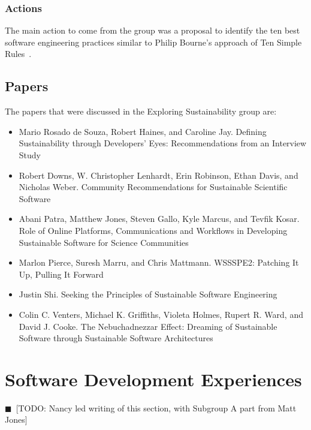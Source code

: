 \documentclass[11pt, oneside]{amsart}
\newcommand{\todo}[1]{{\color{blue}$\blacksquare$~\textsf{[TODO: #1]}}}
\begin{document}
\subsubsection{Actions}

The main action to come from the group was a proposal to identify the ten best
software engineering practices similar to Philip Bourne's approach of Ten Simple
Rules~\cite{bourne-ten-simple-rules}.

\subsection{Papers}
The papers that were discussed in the Exploring Sustainability group are:
\begin{itemize}
\item Mario Rosado de Souza, Robert Haines, and Caroline Jay. Defining
Sustainability through Developers' Eyes: Recommendations from an Interview
Study~\cite{wssspe2_rosada_de_souza}

\item Robert Downs, W. Christopher Lenhardt, Erin Robinson, Ethan Davis, and
Nicholas Weber. Community Recommendations for Sustainable Scientific
Software~\cite{wssspe2_downs}

\item Abani Patra, Matthew Jones, Steven Gallo, Kyle Marcus, and Tevfik Kosar.
Role of Online Platforms, Communications and Workflows in Developing Sustainable
Software for Science Communities~\cite{wssspe2_patra}

\item Marlon Pierce, Suresh Marru, and Chris Mattmann. {WSSSPE2}: Patching It Up,
Pulling It Forward~\cite{wssspe2_pierce}

\item Justin Shi. Seeking the Principles of Sustainable Software
Engineering~\cite{wssspe2_shi}

\item Colin C. Venters, Michael K. Griffiths, Violeta Holmes, Rupert R. Ward, and
David J. Cooke. The Nebuchadnezzar Effect: Dreaming of Sustainable Software
through Sustainable Software Architectures~\cite{wssspe2_venters}
\end{itemize}

\section{Software Development Experiences} \label{sec:devel}
\todo{Nancy led writing of this section, with Subgroup A part from Matt Jones}
\end{document}
